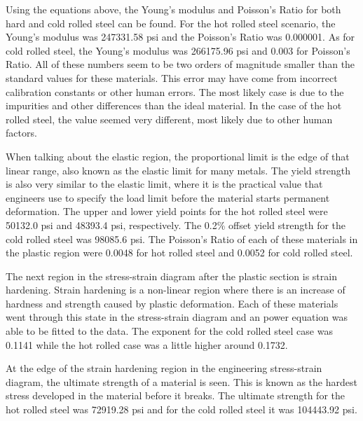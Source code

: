 \documentclass[12pt]{report}
\begin{document}
Using the equations above, the Young's modulus and Poisson's Ratio for both hard and cold rolled steel can be found. For the hot rolled steel scenario, the Young's modulus was 247331.58 psi and the Poisson's Ratio was 0.000001. As for cold rolled steel, the Young's modulus was 266175.96 psi and 0.003 for Poisson's Ratio. All of these numbers seem to be two orders of magnitude smaller than the standard values for these materials. This error may have come from incorrect calibration constants or other human errors. The most likely case is due to the impurities and other differences than the ideal material. In the case of the hot rolled steel, the value seemed very different, most likely due to other human factors.

When talking about the elastic region, the proportional limit is the edge of that linear range, also known as the elastic limit for many metals. The yield strength is also very similar to the elastic limit, where it is the practical value that engineers use to specify the load limit before the material starts permanent deformation. The upper and lower yield points for the hot rolled steel were 50132.0 psi and 48393.4 psi, respectively. The 0.2\% offset yield strength for the cold rolled steel was 98085.6 psi. The Poisson's Ratio of each of these materials in the plastic region were 0.0048 for hot rolled steel and 0.0052 for cold rolled steel.

The next region in the stress-strain diagram after the plastic section is strain hardening. Strain hardening is a non-linear region where there is an increase of hardness and strength caused by plastic deformation. Each of these materials went through this state in the stress-strain diagram and an power equation was able to be fitted to the data. The exponent for the cold rolled steel case was 0.1141 while the hot rolled case was a little higher around 0.1732.

At the edge of the strain hardening region in the engineering stress-strain diagram, the ultimate strength of a material is seen. This is known as the hardest stress developed in the material before it breaks. The ultimate strength for the hot rolled steel was 72919.28 psi and for the cold rolled steel it was 104443.92 psi.
\end{document}
